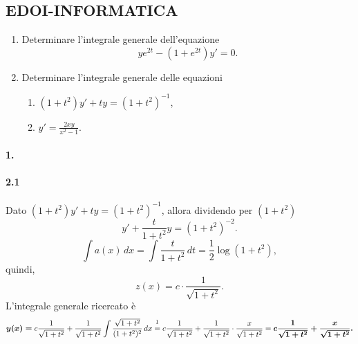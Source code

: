 \subsection{EDOI-INFORMATICA}
\begin{enumerate}
    \item Determinare l'integrale generale dell'equazione
    \begin{equation*}
        ye^{2t}-(1+e^{2t})y'=0.
    \end{equation*}
    \item Determinare l'integrale generale delle equazioni
    \begin{enumerate}
        \item $(1+t^2)y'+ty=(1+t^2)^{-1}$,
        \item $y'=\frac{2xy}{x^2-1}$.
    \end{enumerate}
\end{enumerate}

\paragraph{1.}

\paragraph{2.1} Dato $(1+t^2)y'+ty=(1+t^2)^{-1}$, allora dividendo per $(1+t^2)$
\begin{equation*}
    y'+\frac{t}{1+t^2}y=(1+t^2)^{-2}.
\end{equation*}
\begin{equation*}
    \int a(x)\, dx=\int \frac{t}{1+t^2}\, dt = \frac{1}{2}\log(1+t^2),
\end{equation*}
quindi,
\begin{equation*}
    z(x)=c\cdot\frac{1}{\sqrt{1+t^2}}.
\end{equation*}
L'integrale generale ricercato è
\begin{equation*}
    \boldsymbol{y(x)=}c\frac{1}{\sqrt{1+t^2}}+\frac{1}{\sqrt{1+t^2}}\int\frac{\sqrt{1+t^2}}{(1+t^2)^2}\, dx\overset{\footnotemark}{=} c\frac{1}{\sqrt{1+t^2}}+\frac{1}{\sqrt{1+t^2}}\cdot\frac{x}{\sqrt{1+t^2}}= \boldsymbol{c\frac{1}{\sqrt{1+t^2}}+\frac{x}{\sqrt{1+t^2}}.}
\end{equation*}
